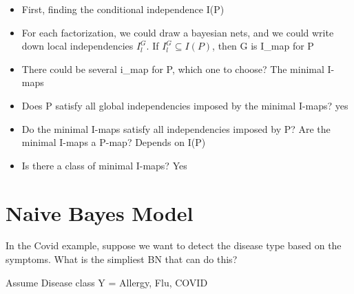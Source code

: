 \documentclass[11pt,a4paper]{report}
\begin{document}
\begin{itemize}
    \item First, finding the conditional independence I(P)
    \item For each factorization, we could draw a bayesian nets, and we could write down local independencies $I_{l}^{G}$. If $I_{l}^{G} \subseteq I(P)$, then G is I\_map for P
    \item There could be several i\_map for P, which one to choose? The minimal I-maps
    \item Does P satisfy all global independencies imposed by the minimal I-maps? yes
    \item Do the minimal I-maps satisfy all independencies imposed by P? Are the minimal I-maps a P-map? Depends on I(P)
    \item Is there a class of minimal I-maps? Yes
\end{itemize}


\chapter{Naive Bayes Model}

In the Covid example, suppose we want to detect the disease type based on the symptoms. What is the simpliest BN that can do this?

Assume Disease class Y = {Allergy, Flu, COVID}
\end{document}
